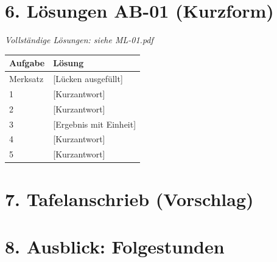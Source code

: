 \documentclass[11pt, a4paper]{article}
\newcommand{\stunde}{01}
\begin{document}

\section*{6. Lösungen AB-\stunde{} (Kurzform)}

\textit{Vollständige Lösungen: siehe ML-\stunde.pdf}

\vspace{0.5em}

\begin{tabular}{|l|l|}
\hline
\textbf{Aufgabe} & \textbf{Lösung} \\
\hline
Merksatz & [Lücken ausgefüllt] \\
\hline
1 & [Kurzantwort] \\
\hline
2 & [Kurzantwort] \\
\hline
3 & [Ergebnis mit Einheit] \\
\hline
4 & [Kurzantwort] \\
\hline
5 & [Kurzantwort] \\
\hline
\end{tabular}


\section*{7. Tafelanschrieb (Vorschlag)}

\begin{infobox}
\end{infobox}

\begin{infobox}
\end{infobox}

\begin{infobox}
\end{infobox}


\section*{8. Ausblick: Folgestunden}
\end{document}
